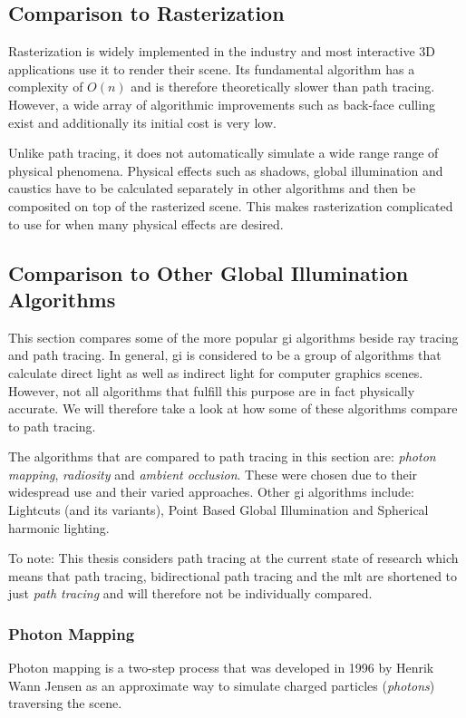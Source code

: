 \documentclass[
  twoside,
  11pt, a4paper,
  footinclude=true,
  headinclude=true,
  cleardoublepage=empty
]{scrreprt}
\begin{document}
\subsection{Comparison to Rasterization}
Rasterization is widely implemented in the industry and most interactive 3D applications use it to
render their scene. Its fundamental algorithm has a complexity of \(O(n)\) and is therefore
theoretically slower than path tracing. However, a wide array of algorithmic improvements such as
back-face culling exist and additionally its initial cost is very low.

Unlike path tracing, it does not automatically simulate a wide range range of physical phenomena.
Physical effects such as shadows, global illumination and caustics have to be calculated separately
in other algorithms and then be composited on top of the rasterized scene. This makes rasterization
complicated to use for when many physical effects are desired.

\subsection{Comparison to Other Global Illumination Algorithms}
This section compares some of the more popular \ac{gi} algorithms beside ray tracing and
path tracing. In general, \ac{gi} is considered to be a group of algorithms that calculate
direct light as well as indirect light for computer graphics scenes. However, not all algorithms
that fulfill this purpose are in fact physically accurate. We will therefore take a look at how
some of these algorithms compare to path tracing.

The algorithms that are compared to path tracing in this section are: \emph{photon mapping},
\emph{radiosity} and
\emph{ambient occlusion}. These were chosen due to their widespread use and their varied approaches.
Other \ac{gi} algorithms include: Lightcuts (and its variants), Point Based Global Illumination
and Spherical harmonic lighting.

To note: This thesis considers path tracing at the current state of research which means that path
tracing, bidirectional path tracing and the \ac{mlt} are shortened to just \emph{path tracing} and
will therefore not be individually compared.

\subsubsection{Photon Mapping}
Photon mapping is a two-step process that was developed in 1996 by Henrik Wann Jensen \cite{inproceedings:photon-mapping} as
an approximate way to simulate charged particles (\emph{photons}) traversing the scene.
\end{document}
